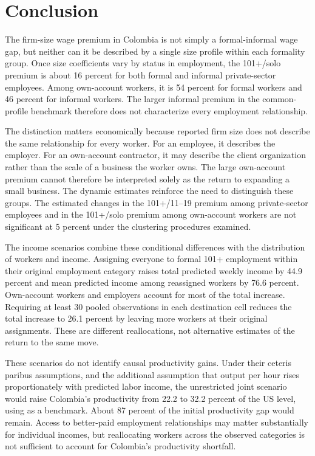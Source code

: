 \section{Conclusion}

The firm-size wage premium in Colombia is not simply a formal-informal wage
gap, but neither can it be described by a single size profile within each
formality group. Once size coefficients vary by status in employment, the
101+/solo premium is about 16 percent for both formal and informal
private-sector employees. Among own-account workers, it is 54 percent for
formal workers and 46 percent for informal workers. The larger informal
premium in the common-profile benchmark therefore does not characterize
every employment relationship.

The distinction matters economically because reported firm size does not
describe the same relationship for every worker. For an employee, it describes
the employer. For an own-account contractor, it may describe the client
organization rather than the scale of a business the worker owns. The large
own-account premium cannot therefore be interpreted solely as the return to
expanding a small business. The dynamic estimates reinforce the need to
distinguish these groups. The estimated changes in the 101+/11--19 premium
among private-sector employees and in the 101+/solo premium among own-account
workers are not significant at 5 percent under the clustering procedures
examined.

The income scenarios combine these conditional differences with the
distribution of workers and income. Assigning everyone to formal 101+
employment within their original employment category raises total predicted
weekly income by 44.9 percent and mean predicted income among reassigned
workers by 76.6 percent. Own-account workers and employers account for most
of the total increase. Requiring at least 30 pooled observations in each
destination cell reduces the total increase to 26.1 percent by leaving more
workers at their original assignments. These are different reallocations,
not alternative estimates of the return to the same move.

These scenarios do not identify causal productivity gains. Under their
ceteris paribus assumptions, and the additional assumption that output per
hour rises proportionately with predicted labor income, the unrestricted
joint scenario would raise Colombia's productivity from 22.2 to 32.2 percent
of the US level, using \citet{OECD2026Productivity} as a benchmark. About
87 percent of the initial productivity gap would remain. Access to better-paid
employment relationships may matter substantially for individual incomes,
but reallocating workers across the observed categories is not sufficient
to account for Colombia's productivity shortfall.
